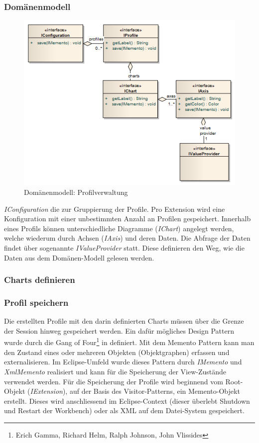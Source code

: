 \subsubsection{Domänenmodell}
 \begin{figure}[H]
  	\centering
        	\caption{Domänenmodell: Profilverwaltung}
    	\includegraphics[width=13cm]{images/core_domain_profiles}
\end{figure}
\textit{IConfiguration} die zur Gruppierung der Profile. Pro Extension wird eine Konfiguration mit einer unbestimmten Anzahl an Profilen gespeichert. Innerhalb eines Profils können unterschiedliche Diagramme (\textit{IChart}) angelegt werden, welche wiederum durch Achsen (\textit{IAxis}) und deren Daten. Die Abfrage der Daten findet über sogenannte \textit{IValueProvider} statt. Diese definieren den Weg, wie die Daten aus dem Domänen-Modell gelesen werden.

\subsubsection{Charts definieren}
\subsubsection{Profil speichern}
Die erstellten Profile mit den darin definierten Charts müssen über die Grenze der Session hinweg gespeichert werden. Ein dafür mögliches Design Pattern wurde durch die Gang of Four\footnote{Erich Gamma, Richard Helm, Ralph Johnson, John Vlissides} in \cite[S. 283]{gamma1995design} definiert. Mit dem Memento Pattern kann man den Zustand eines oder mehreren Objekten (Objektgraphen) erfassen und externalisieren. Im Eclipse-Umfeld wurde dieses Pattern durch \textit{IMemento} und \textit{XmlMemento} realisiert und kann für die Speicherung der View-Zustände verwendet werden. Für die Speicherung der Profile wird beginnend vom Root-Objekt (\textit{IExtension}), auf der Basis des Visitor-Patterns\cite[S. 331]{gamma1995design}, ein Memento-Objekt erstellt. Dieses wird anschliessend im Eclipse-Context (dieser überlebt Shutdown und Restart der Workbench) oder als XML auf dem Datei-System gespeichert. 

